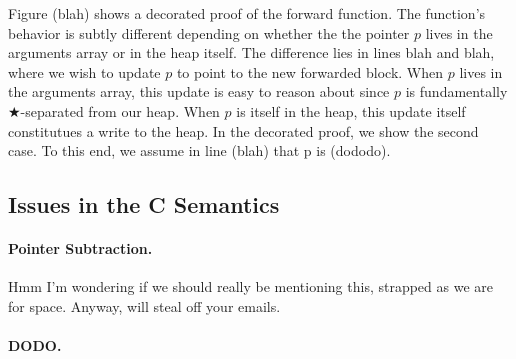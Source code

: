 Figure (blah) shows a decorated proof of the forward function.
The function's behavior is subtly different depending on 
whether the the pointer $p$ lives in the arguments array or in the 
heap itself. The difference lies in lines blah and blah, where 
we wish to update $p$ to point to the new forwarded block. 
When $p$ lives in the arguments array, this update is easy to 
reason about since $p$ is fundamentally $\bigstar$-separated from our heap. 
When $p$ is itself in the heap, this update itself constitutues a
write to the heap. In the decorated proof, we show the second 
case. To this end, we assume in line (blah) that p is (dododo). 



\subsection{Issues in the C Semantics}
\label{sec:gccsemantics}

\paragraph{Pointer Subtraction.}
{\color{blue}Hmm I'm wondering if we should really be mentioning this,
strapped as we are for space. Anyway, will steal off your emails.}


\paragraph{DODO.}






